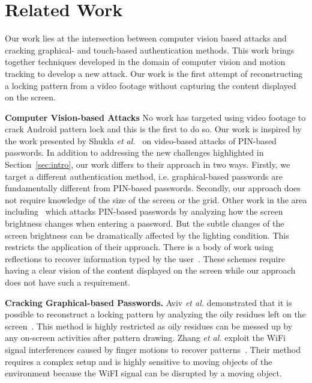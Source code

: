 \section{Related Work}
\label{section: relate-work}
Our work lies at the intersection between computer vision based attacks and
cracking graphical- and touch-based authentication methods. This work brings
together techniques developed in the domain of computer vision and motion
tracking to develop a new attack. Our work is the first attempt
of reconstructing a locking pattern from a video footage without
capturing the content displayed on the screen.

\vspace{2mm}
\noindent \textbf{Computer Vision-based Attacks} No work has targeted using video
footage to crack Android pattern lock and this is the first to do so. Our work is inspired by the work
presented by Shukla \emph{et al.}~\cite{shukla2014beware} on video-based attacks of
PIN-based passwords. In addition to addressing the new challenges highlighted in Section~\ref{sec:intro}, our work differs to their approach in
two ways.
Firstly, we target a different authentication method, i.e. graphical-based passwords are fundamentally different from PIN-based passwords. %
Secondly, our approach does not require knowledge of the size of the screen or the grid.
Other work in the area including~\cite{yue2014blind} which attacks PIN-based passwords by analyzing how the screen brightness changes when entering a password.
But the subtle changes of the screen brightness can be dramatically affected by the lighting condition. This restricts the application of their approach.
There is a body of work using reflections to recover information typed by the user~\cite{kuhn2002compromising,xu2013seeing,raguram2011ispy,backes2009tempest}. These schemes require having a clear vision of the content displayed on the screen while our approach does not have such a requirement.

\vspace{2mm}
\noindent \textbf{Cracking Graphical-based Passwords.}
Aviv \emph{et al.} demonstrated that it is possible to reconstruct a locking pattern by analyzing the oily residues left on the screen~\cite{aviv2010smudge}.
 This method is highly restricted as oily residues can be messed up by any on-screen activities after pattern drawing.
Zhang \emph{et al.} exploit the WiFi signal interferences caused by finger motions to recover patterns~\cite{zhang2016privacy}. Their method requires a complex setup and is highly sensitive to moving objects of the environment
because the WiFI signal can be disrupted by a moving object.

